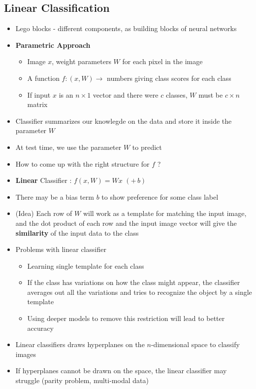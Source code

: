 \subsection{Linear Classification}
\begin{itemize}
	\item Lego blocks - different components, as building blocks of neural networks
	\item \textbf{Parametric Approach}
	\begin{itemize}
		\item Image $x$, weight parameters $W$ for each pixel in the image
		\item A function $f : (x, W) \rightarrow$ numbers giving class scores for each class
		\item If input $x$ is an $n\times 1$ vector and there were $c$ classes, $W$ must be $c\times n$ matrix
	\end{itemize}
	\item Classifier summarizes our knowlegde on the data and store it inside the parameter $W$
	\item At test time, we use the parameter $W$ to predict
	\item How to come up with the right structure for $f$ ?
	\item \textbf{Linear} Classifier : $f(x, W) = Wx$ $(+\, b)$
	\item There may be a bias term $b$ to show preference for some class label
	\item (Idea) Each row of $W$ will work as a template for matching the input image, and the dot product of each row and the input image vector will give the \textbf{similarity} of the input data to the class
	\item Problems with linear classifier
	\begin{itemize}
		\item Learning single template for each class
		\item If the class has variations on how the class might appear, the classifier averages out all the variations and tries to recognize the object by a single template
		\item Using deeper models to remove this restriction will lead to better accuracy
	\end{itemize}
	\item Linear classifiers draws hyperplanes on the $n$-dimensional space to classify images
	\item If hyperplanes cannot be drawn on the space, the linear classifier may struggle (parity problem, multi-modal data)
\end{itemize}
























